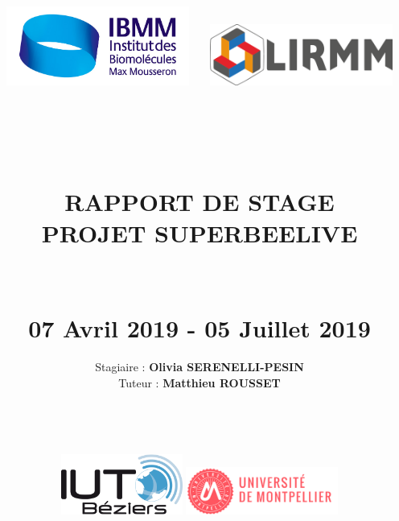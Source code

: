 \documentclass[11pt,french,a4paper]{report}
\begin{document}
    \title{
        \includegraphics[width=6cm]{../images/logo/logoibmm.jpg}\hspace{2cm} 
           \includegraphics[width=6cm]{../images/logo/logo_lirmm_trans.png} \\
           \normalsize\textsc{}
           \hfill \\
           \hrulefill \\
           \hfill \\
           \LARGE \textbf{\uppercase{Rapport de Stage \\ Projet Superbeelive}} \\
           \hrulefill \\
           \hfill \\
           \Large{07 Avril 2019 - 05 Juillet 2019} \vspace*{5\baselineskip}
           }
         
    \author{
           \large{Stagiaire : \textbf{Olivia SERENELLI-PESIN}} \\
           \large{Tuteur : \textbf{Matthieu ROUSSET}} \\
            \bigskip \\
           \hfill \\
           \hfill \\
           \hfill \\
            \includegraphics[width=4cm]{../images/logo/logo_iutbeziers.png}\hspace{7cm}
            \includegraphics[width=5cm]{../images/logo/um_logo.png}
            \date{}
            }
\maketitle
\end{document}

